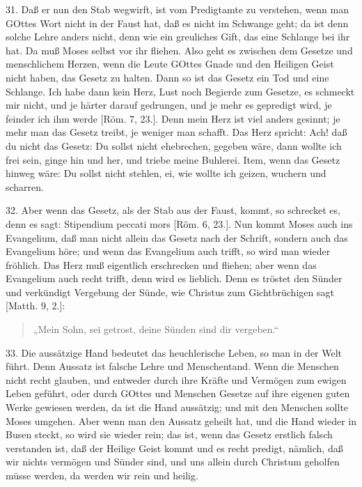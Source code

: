 31. Daß er nun den Stab wegwirft, ist vom Predigtamte zu verstehen, wenn man GOttes Wort nicht in der Faust hat, daß es nicht im Schwange geht; da ist denn solche Lehre anders nicht, denn wie ein greuliches Gift, das eine Schlange bei ihr hat. Da muß Moses selbst vor ihr fliehen. Also geht es zwischen dem Gesetze und menschlichem Herzen, wenn die Leute GOttes Gnade und den Heiligen Geist nicht haben, das Gesetz zu halten. Dann so ist das Gesetz ein Tod und eine Schlange. Ich habe dann kein Herz, Lust noch Begierde zum Gesetze, es schmeckt mir nicht, und je härter darauf gedrungen, und je mehr es gepredigt wird, je feinder ich ihm werde [Röm. 7, 23.]. Denn mein Herz ist viel anders gesinnt; je mehr man das Gesetz treibt, je weniger man schafft. Das Herz spricht: Ach! daß du nicht das Gesetz: Du sollst nicht ehebrechen, gegeben wäre, dann wollte ich frei sein, ginge hin und her, und triebe meine Buhlerei. Item, wenn das Gesetz hinweg wäre: Du sollst nicht stehlen, ei, wie wollte ich geizen, wuchern und scharren.

32. Aber wenn das Gesetz, als der Stab aus der Faust, kommt, so schrecket es, denn es sagt: Stipendium peccati mors [Röm. 6, 23.]. Nun kommt Moses auch ins Evangelium, daß man nicht allein das Gesetz nach der Schrift, sondern auch das Evangelium höre; und wenn das Evangelium auch trifft, so wird man wieder fröhlich. Das Herz muß eigentlich erschrecken und fliehen; aber wenn das Evangelium auch recht trifft, denn wird es lieblich. Denn es tröstet den Sünder und verkündigt Vergebung der Sünde, wie Christus zum Gichtbrüchigen sagt [Matth. 9, 2.]:

\begin{quote}
„Mein Sohn, sei getrost, deine Sünden sind dir vergeben.“
\end{quote}

33. Die aussätzige Hand bedeutet das heuchlerische Leben, so man in der Welt führt. Denn Aussatz ist falsche Lehre und Menschentand. Wenn die Menschen nicht recht glauben, und entweder durch ihre Kräfte und Vermögen zum ewigen Leben geführt, oder durch GOttes und Menschen Gesetze auf ihre eigenen guten Werke gewiesen werden, da ist die Hand aussätzig; und mit den Menschen sollte Moses umgehen. Aber wenn man den Aussatz geheilt hat, und die Hand wieder in Busen steckt, so wird sie wieder rein; das ist, wenn das Gesetz erstlich falsch verstanden ist, daß der Heilige Geist kommt und es recht predigt, nämlich, daß wir nichts vermögen und Sünder sind, und uns allein durch Christum geholfen müsse werden, da werden wir rein und heilig.

